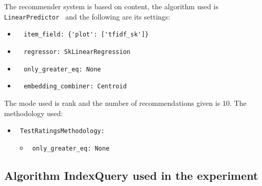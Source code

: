 \documentclass[11pt]{article}
\begin{document}
The recommender system is based on content, the algorithm used
is \verb| LinearPredictor | and the following are its settings:
\begin{itemize}
 \item \begin{verbatim}
  item_field: {'plot': ['tfidf_sk']}
\end{verbatim}
 \item \begin{verbatim}
  regressor: SkLinearRegression
\end{verbatim}
 \item \begin{verbatim}
  only_greater_eq: None
\end{verbatim}
 \item \begin{verbatim}
  embedding_combiner: Centroid
\end{verbatim}
\end{itemize}
\hfill\break
The mode used is rank and the number of recommendations given
is 10.
The methodology used:
\begin{itemize}
    \item \verb| TestRatingsMethodology:|
    \begin{itemize}
                    \item \verb| only_greater_eq: None |
            \end{itemize}
\end{itemize}
\hfill\break






\subsection{Algorithm IndexQuery used in the experiment}\label{subsec:algo_IndexQuery}
\end{document}
